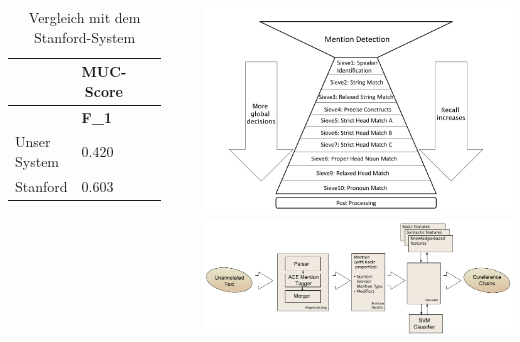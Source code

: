 \documentclass[25pt, a0paper, portrait, margin=10mm, innermargin=15mm,
blockverticalspace=15mm, colspace=15mm, subcolspace=8mm]{tikzposter}
\begin{document}
\begin{columns}
{\begin{table}[h]
\begin{tabular}{l||ll|l}
& \multicolumn{1}{c}{\textbf{MUC-Score}} \\ \hline
          &    \textbf{F\_1}    \\ \hline
Unser System &	  0.420  \\
Stanford   &	0.603
\end{tabular}
\caption{Vergleich mit dem Stanford-System}
\label{tab:ml_vergleich}
\end{table}
}

 
\begin{subcolumns}     \end{subcolumns}
{\includegraphics{stanford}}
{\includegraphics{bart_summary.png}}
\end{columns}
\end{document}
